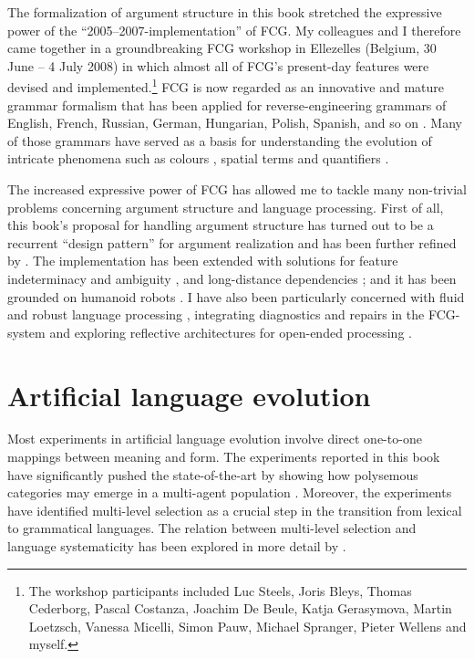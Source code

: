The formalization of argument structure in this book stretched the expressive power of the ``2005--2007-implementation'' of FCG. My colleagues and I therefore came together in a groundbreaking FCG workshop in Ellezelles (Belgium, 30 June -- 4 July 2008) in which almost all of FCG's present-day features were devised and implemented.\footnote{The workshop participants included Luc Steels, Joris Bleys, Thomas Cederborg, Pascal Costanza, Joachim De Beule, Katja Gerasymova, Martin Loetzsch, Vanessa Micelli, Simon Pauw, Michael Spranger, Pieter Wellens and myself.} FCG is now regarded as an innovative and mature grammar formalism \citep{vantrijp13comparison} that has been applied for reverse-engineering grammars of English, French, Russian, German, Hungarian, Polish, Spanish, and so on \citep{steels11design,steels12computational,steels12language}. Many of those grammars have served as a basis for understanding the evolution of intricate phenomena such as colours \citep{bleys10}, spatial terms \citep{spranger:11b} and quantifiers \citep{pauw13}.

The increased expressive power of FCG has allowed me to tackle many non-trivial problems concerning argument structure and language processing. First of all, this book's proposal for handling argument structure has turned out to be a recurrent ``design pattern'' for argument realization and has been further refined by \citet{vantrijp11design}. The implementation has been extended with solutions for feature indeterminacy and ambiguity \citep{vantrijp11feature}, and long-distance dependencies \citep{vantrijp14}; and it has been grounded on humanoid robots \citep{steels12action}. I have also been particularly concerned with fluid and robust language processing \citep{steels11how}, integrating diagnostics and repairs in the FCG-system \citep{beuls12diagnostics} and exploring reflective architectures for open-ended processing \citep{vantrijp12robust}.

\section*{Artificial language evolution}

Most experiments in artificial language evolution involve direct one-to-one mappings between meaning and form. The experiments reported in this book have significantly pushed the state-of-the-art by showing how polysemous categories may emerge in a multi-agent population \citep[for more recent results, see][]{vantrijp10grammaticalization,vantrijp:11a,vantrijp12b,vantrijp12case}. Moreover, the experiments have identified multi-level selection as a crucial step in the transition from lexical to grammatical languages. The relation between multi-level selection and language systematicity has been explored in more detail by \citet{vantrijp:12f}.

